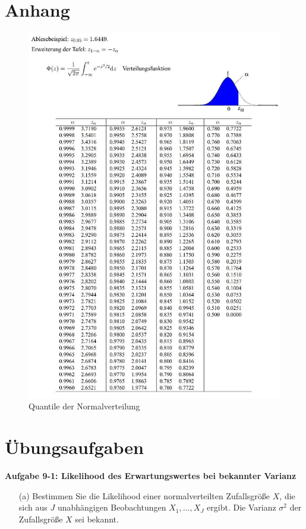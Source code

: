 \newpage
\section*{Anhang}
\begin{figure}[!h]
	\begin{center}
		\includegraphics[width=140mm]
		{08_vorlesung/media/NV_Quantile.jpg}
		\caption{
			Quantile der Normalverteilung}
			\label{fig:Quantile_der_Normalverteilung} 
	\end{center}
\end{figure}
\newpage
\section{Übungsaufgaben}
\textbf{Aufgabe 9-1: Likelihood des Erwartungswertes bei bekannter Varianz}
\begin{itemize}
	\item [(a)] Bestimmen Sie die Likelihood einer normalverteilten Zufallsgröße $X$, die sich aus $J$ unabhängigen Beobachtungen $X_1,\ldots,X_J$ ergibt. 
	Die Varianz $\sigma^2$ der Zufallsgröße $X$ sei bekannt.
\end{itemize}


